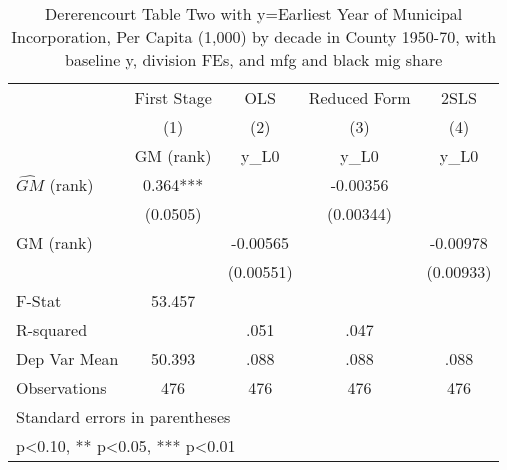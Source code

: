 \begin{table}[htbp]\centering
\def\sym#1{\ifmmode^{#1}\else\(^{#1}\)\fi}
\caption{Dererencourt Table Two with y=Earliest Year of Municipal Incorporation, Per Capita (1,000) by decade in County 1950-70, with baseline y, division FEs, and mfg and black mig share}
\begin{tabular}{l*{4}{c}}
\toprule
                    & First Stage   &         OLS   &Reduced Form   &        2SLS   \\
                    &\multicolumn{1}{c}{(1)}&\multicolumn{1}{c}{(2)}&\multicolumn{1}{c}{(3)}&\multicolumn{1}{c}{(4)}\\
                    &\multicolumn{1}{c}{GM  (rank)}&\multicolumn{1}{c}{y\_L0}&\multicolumn{1}{c}{y\_L0}&\multicolumn{1}{c}{y\_L0}\\
\midrule
$\hat{GM}$ (rank)   &       0.364***&               &    -0.00356   &               \\
                    &    (0.0505)   &               &   (0.00344)   &               \\
\addlinespace
GM  (rank)          &               &    -0.00565   &               &    -0.00978   \\
                    &               &   (0.00551)   &               &   (0.00933)   \\
\midrule
F-Stat              &      53.457   &               &               &               \\
R-squared           &               &        .051   &        .047   &               \\
Dep Var Mean        &      50.393   &        .088   &        .088   &        .088   \\
Observations        &         476   &         476   &         476   &         476   \\
\bottomrule
\multicolumn{5}{l}{\footnotesize Standard errors in parentheses}\\
\multicolumn{5}{l}{\footnotesize * p<0.10, ** p<0.05, *** p<0.01}\\
\end{tabular}
\end{table}
